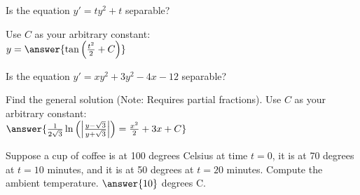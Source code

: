 \documentclass{ximera}
\begin{document}
\begin{exercise}
    Is the equation $y' = ty^2 + t$ separable?
    \begin{multipleChoice}
    \end{multipleChoice}
    \begin{problem}
        Use $C$ as your arbitrary constant:\\
        $y = \answer{\tan\left(\frac{t^2}{2} + C\right)}$
    \end{problem}
\end{exercise}

\begin{exercise}
    Is the equation $y' = xy^2 + 3y^2 - 4x - 12$ separable? 
    \begin{multipleChoice}
    \end{multipleChoice}
    \begin{problem}
        Find the general solution (Note: Requires partial fractions). Use $C$ as your arbitrary constant:\\
        $\answer{\frac{1}{2\sqrt{3}}\ln\left(\left| \frac{y - \sqrt{3}}{y+\sqrt{3}}\right|\right) = \frac{x^2}{2} + 3x + C}$
    \end{problem}
\end{exercise}

\begin{exercise}
    Suppose a cup of coffee is at 100 degrees Celsius at time $t=0$, it is at 70 degrees at $t=10$ minutes, and it is at 50 degrees at $t=20$ minutes.  Compute the ambient temperature. $\answer{10}$ degrees C.
\end{exercise}
\end{document}
